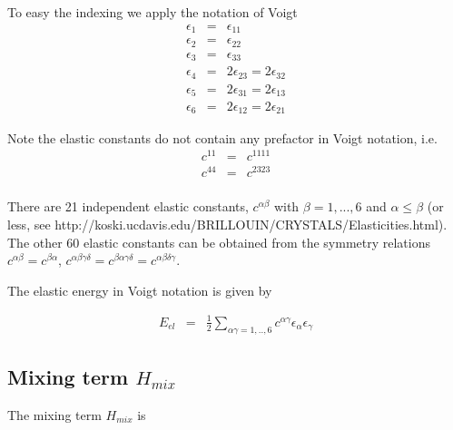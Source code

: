 To easy the indexing we apply the notation of Voigt
\begin{eqnarray}\label{voigt}
\epsilon_1&=&\epsilon_{11}  \\
\epsilon_2&=&\epsilon_{22} \nonumber \\
\epsilon_3&=&\epsilon_{33}\nonumber \\
\epsilon_4&=&2\epsilon_{23}=2\epsilon_{32}\nonumber \\
\epsilon_5&=&2\epsilon_{31}=2\epsilon_{13}\nonumber \\
\epsilon_6&=&2\epsilon_{12}=2\epsilon_{21} \nonumber
\end{eqnarray}

Note the elastic constants do not contain any prefactor in Voigt notation, i.e.
\begin{eqnarray}\label{voigtel}
c^{11}&=&c^{1111} \\
c^{44}&=&c^{2323} \nonumber \\
\end{eqnarray}

There are 21 independent elastic constants, $c^{\alpha\beta}$ with $\beta=1,...,6$ and
$\alpha \le \beta$ (or less, see  http://koski.ucdavis.edu/BRILLOUIN/CRYSTALS/Elasticities.html). The other 60 elastic constants 
can be obtained from the symmetry relations $c^{\alpha\beta}=c^{\beta\alpha}$, 
$c^{\alpha\beta\gamma\delta}=c^{\beta\alpha\gamma\delta}=c^{\alpha\beta\delta\gamma}$.

The elastic energy in Voigt notation is given by

\begin{eqnarray}\label{Eelconstvoigt}
E_{el} &=& \frac{1}{2}\sum_{\alpha\gamma=1,..,6} c^{\alpha\gamma} \epsilon_{\alpha}\epsilon_{\gamma}
\end{eqnarray}

\subsection{Mixing term $H_{mix}$}

The mixing term $H_{mix}$ is 


